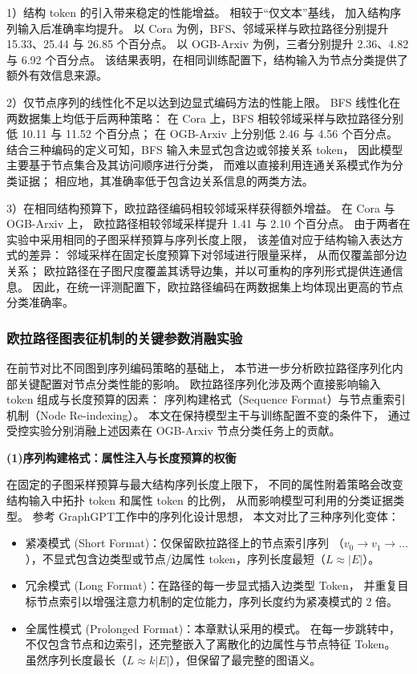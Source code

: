 1）结构 token 的引入带来稳定的性能增益。
相较于“仅文本”基线，
加入结构序列输入后准确率均提升。
以 Cora 为例，BFS、邻域采样与欧拉路径分别提升 15.33、25.44 与 26.85 个百分点。
以 OGB-Arxiv 为例，三者分别提升 2.36、4.82 与 6.92 个百分点。
该结果表明，在相同训练配置下，结构输入为节点分类提供了额外有效信息来源。

2）仅节点序列的线性化不足以达到边显式编码方法的性能上限。
BFS 线性化在两数据集上均低于后两种策略：
在 Cora 上，BFS 相较邻域采样与欧拉路径分别低 10.11 与 11.52 个百分点；
在 OGB-Arxiv 上分别低 2.46 与 4.56 个百分点。
结合三种编码的定义可知，BFS 输入未显式包含边或邻接关系 token，
因此模型主要基于节点集合及其访问顺序进行分类，
而难以直接利用连通关系模式作为分类证据；
相应地，其准确率低于包含边关系信息的两类方法。

3）在相同结构预算下，欧拉路径编码相较邻域采样获得额外增益。
在 Cora 与 OGB-Arxiv 上，
欧拉路径相较邻域采样提升 1.41 与 2.10 个百分点。
由于两者在实验中采用相同的子图采样预算与序列长度上限，
该差值对应于结构输入表达方式的差异：
邻域采样在固定长度预算下对邻域进行限量采样，
从而仅覆盖部分边关系；
欧拉路径在子图尺度覆盖其诱导边集，并以可重构的序列形式提供连通信息。
因此，在统一评测配置下，欧拉路径编码在两数据集上均体现出更高的节点分类准确率。


\subsubsection{欧拉路径图表征机制的关键参数消融实验}
\label{subsec:ablation_parameters}

在前节对比不同图到序列编码策略的基础上，
本节进一步分析欧拉路径序列化内部关键配置对节点分类性能的影响。
欧拉路径序列化涉及两个直接影响输入 token 组成与长度预算的因素：
{序列构建格式（Sequence Format）}与{节点重索引机制（Node Re-indexing）}。
本文在保持模型主干与训练配置不变的条件下，
通过受控实验分别消融上述因素在 OGB-Arxiv 节点分类任务上的贡献。

\textbf{(1)序列构建格式：属性注入与长度预算的权衡}

在固定的子图采样预算与最大结构序列长度上限下，
不同的属性附着策略会改变结构输入中拓扑 token 和属性 token 的比例，
从而影响模型可利用的分类证据类型。
参考 GraphGPT\cite{Zhao2023GraphGPTGP}工作中的序列化设计思想，
本文对比了三种序列化变体：
\begin{itemize}
    \item {紧凑模式 (Short Format)}：仅保留欧拉路径上的节点索引序列
    （$v_0 \to v_1 \to \dots$），不显式包含边类型或节点/边属性 token，序列长度最短（$L \approx |E|$）。
    \item {冗余模式 (Long Format)}：在路径的每一步显式插入边类型 Token，
    并重复目标节点索引以增强注意力机制的定位能力，序列长度约为紧凑模式的 2 倍。
    \item {全属性模式 (Prolonged Format)}：本章默认采用的模式。
    在每一步跳转中，不仅包含节点和边索引，还完整嵌入了离散化的边属性与节点特征 Token。
    虽然序列长度最长（$L \approx k|E|$），但保留了最完整的图语义。
\end{itemize}

